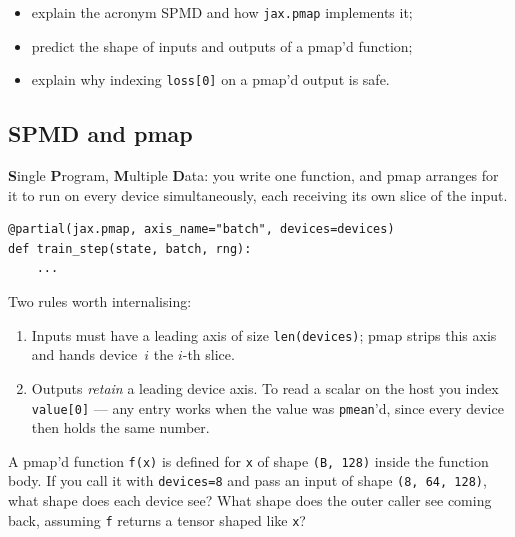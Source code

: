 \documentclass[11pt,a4paper]{article}
\newcounter{exercise}[section]
\newcommand{\answerspace}[1][3]{\vspace{#1\baselineskip}}
\newcommand{\stars}[1]{\textbf{\small(#1)}}
\begin{document}
\begin{objectives}
\begin{itemize}[leftmargin=*, itemsep=1pt]
    \item explain the acronym SPMD and how \texttt{jax.pmap} implements it;
    \item predict the shape of inputs and outputs of a pmap'd function;
    \item explain why indexing \texttt{loss[0]} on a pmap'd output is safe.
\end{itemize}
\end{objectives}

\subsection{SPMD and pmap}

\begin{keypoint}
\textbf{S}ingle \textbf{P}rogram, \textbf{M}ultiple \textbf{D}ata: you write one function, and
pmap arranges for it to run on every device simultaneously, each receiving its own slice of
the input.
\end{keypoint}

\begin{lstlisting}[style=py]
@partial(jax.pmap, axis_name="batch", devices=devices)
def train_step(state, batch, rng):
    ...
\end{lstlisting}

Two rules worth internalising:

\begin{enumerate}
\item Inputs must have a leading axis of size \texttt{len(devices)}; pmap strips this axis
      and hands device~$i$ the $i$-th slice.
\item Outputs \emph{retain} a leading device axis. To read a scalar on the host you index
      \texttt{value[0]} --- any entry works when the value was \texttt{pmean}'d, since every
      device then holds the same number.
\end{enumerate}

\begin{exercise}[Input/output shapes, \stars{2}]
A pmap'd function \texttt{f(x)} is defined for \texttt{x} of shape \texttt{(B, 128)} inside
the function body. If you call it with \texttt{devices=8} and pass an input of shape
\texttt{(8, 64, 128)}, what shape does each device see? What shape does the outer caller
see coming back, assuming \texttt{f} returns a tensor shaped like \texttt{x}?
\answerspace[3]
\end{exercise}
\end{document}
